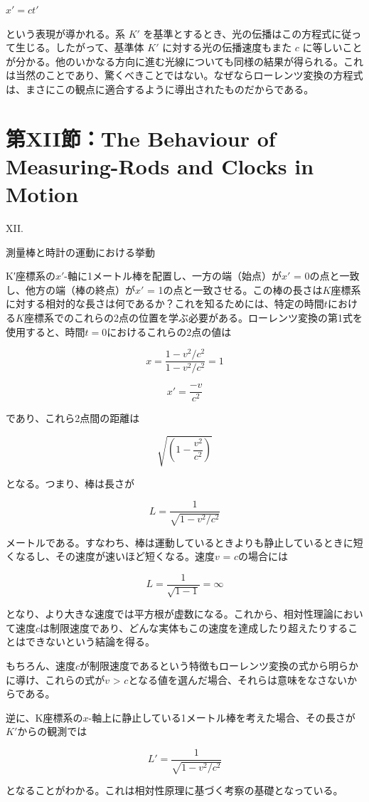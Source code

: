 \documentclass[a4paper,11pt,openany]{ltjsbook}
\begin{document}
$x' = ct'$

という表現が導かれる。系 $K'$ を基準とするとき、光の伝播はこの方程式に従って生じる。したがって、基準体 $K'$ に対する光の伝播速度もまた $c$ に等しいことが分かる。他のいかなる方向に進む光線についても同様の結果が得られる。これは当然のことであり、驚くべきことではない。なぜならローレンツ変換の方程式は、まさにこの観点に適合するように導出されたものだからである。


\clearpage
\chapter{第XII節：The Behaviour of Measuring-Rods and Clocks in Motion}

XII.

測量棒と時計の運動における挙動

K′座標系の$x′$-軸に1メートル棒を配置し、一方の端（始点）が$x′$ = 0の点と一致し、他方の端（棒の終点）が$x′$ = 1の点と一致させる。この棒の長さは$K$座標系に対する相対的な長さは何であるか？これを知るためには、特定の時間$t$における$K$座標系でのこれらの2点の位置を学ぶ必要がある。ローレンツ変換の第1式を使用すると、時間$t = 0$におけるこれらの2点の値は

\[
x = \frac{1 - v^2/c^2}{1 - v^2/c^2} = 1
\]

\[
x' = \frac{-v}{c^2}
\]

であり、これら2点間の距離は

\[
\sqrt{\left(1 - \frac{v^2}{c^2}\right)}
\]

となる。つまり、棒は長さが

\[
L = \frac{1}{\sqrt{1 - v^2/c^2}}
\]

メートルである。すなわち、棒は運動しているときよりも静止しているときに短くなるし、その速度が速いほど短くなる。速度$v$ = $c$の場合には

\[
L = \frac{1}{\sqrt{1 - 1}} = \infty
\]

となり、より大きな速度では平方根が虚数になる。これから、相対性理論において速度$c$は制限速度であり、どんな実体もこの速度を達成したり超えたりすることはできないという結論を得る。

もちろん、速度$c$が制限速度であるという特徴もローレンツ変換の式から明らかに導け、これらの式が$v$ > $c$となる値を選んだ場合、それらは意味をなさないからである。

逆に、K座標系の$x$-軸上に静止している1メートル棒を考えた場合、その長さが$K′$からの観測では

\[
L' = \frac{1}{\sqrt{1 - v^2/c^2}}
\]

となることがわかる。これは相対性原理に基づく考察の基礎となっている。
\end{document}
